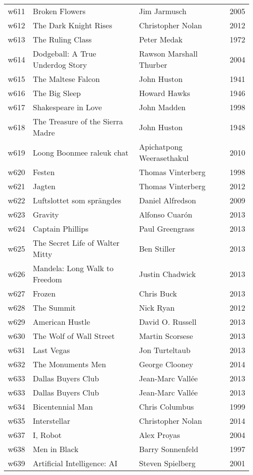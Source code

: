 \documentclass{article}
\begin{document}
\begin {center}
\begin{longtable}{l p{10cm} l l}
w611 & Broken Flowers & Jim Jarmusch & 2005 \\
w612 & The Dark Knight Rises & Christopher Nolan & 2012 \\
w613 & The Ruling Class & Peter Medak & 1972 \\
w614 & Dodgeball: A True Underdog Story & Rawson Marshall Thurber & 2004 \\
w615 & The Maltese Falcon & John Huston & 1941 \\
w616 & The Big Sleep & Howard Hawks & 1946 \\
w617 & Shakespeare in Love & John Madden & 1998 \\
w618 & The Treasure of the Sierra Madre & John Huston & 1948 \\
w619 & Loong Boonmee raleuk chat & Apichatpong Weerasethakul & 2010 \\
w620 & Festen & Thomas Vinterberg & 1998 \\
w621 & Jagten & Thomas Vinterberg & 2012 \\
w622 & Luftslottet som sprängdes & Daniel Alfredson & 2009 \\
w623 & Gravity & Alfonso Cuarón & 2013 \\
w624 & Captain Phillips & Paul Greengrass & 2013 \\
w625 & The Secret Life of Walter Mitty & Ben Stiller & 2013 \\
w626 & Mandela: Long Walk to Freedom & Justin Chadwick & 2013 \\
w627 & Frozen & Chris Buck & 2013 \\
w628 & The Summit & Nick Ryan & 2012 \\
w629 & American Hustle & David O. Russell & 2013 \\
w630 & The Wolf of Wall Street & Martin Scorsese & 2013 \\
w631 & Last Vegas & Jon Turteltaub & 2013 \\
w632 & The Monuments Men & George Clooney & 2014 \\
w633 & Dallas Buyers Club & Jean-Marc Vallée & 2013 \\
w633 & Dallas Buyers Club & Jean-Marc Vallée & 2013 \\
w634 & Bicentennial Man & Chris Columbus & 1999 \\
w635 & Interstellar & Christopher Nolan & 2014 \\
w637 & I, Robot & Alex Proyas & 2004 \\
w638 & Men in Black & Barry Sonnenfeld & 1997 \\
w639 & Artificial Intelligence: AI & Steven Spielberg & 2001 \\

\end{longtable}
\end{center}
\end{document}

